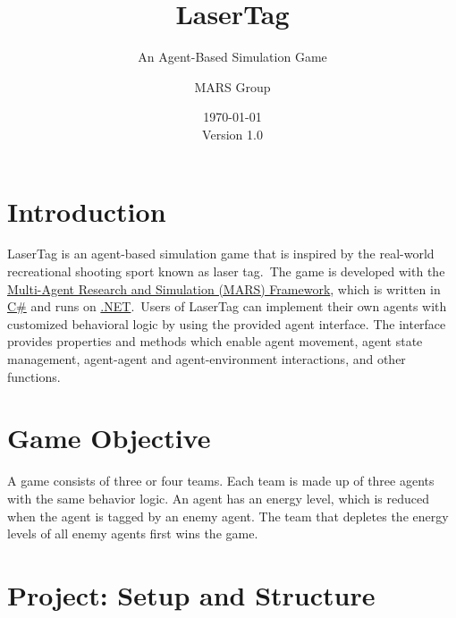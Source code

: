 \documentclass[
  a4paper,
  english,
  DIV=16,
  11pt,
  parskip=half,
  dvipsnames,
  listof=totoc,		     %
  index=totoc,		     %
  bibliography=totoc,	 %
]{scrartcl}
\title{LaserTag}
\subtitle{An Agent-Based Simulation Game}
\author{MARS Group}
\date{\today\\Version 1.0}
\begin{document}
\maketitle
%
%
\tableofcontents
%
%
\clearpage
%
\section{Introduction}
LaserTag is an agent-based simulation game that is inspired by the real-world recreational shooting sport known as laser tag.~The game is developed with the \href{https://mars-group-haw.github.io/index.html}{Multi-Agent Research and Simulation (MARS) Framework}, which is written in \href{https://learn.microsoft.com/en-us/dotnet/csharp/}{C\#} and runs on \href{https://dotnet.microsoft.com/en-us/download}{.NET}.~Users of LaserTag can implement their own agents with customized behavioral logic by using the provided agent interface. The interface provides properties and methods which enable agent movement, agent state management, agent-agent and agent-environment interactions, and other functions.
%
\section{Game Objective} \label{sec:objective}
%
A game consists of three or four teams. Each team is made up of three agents with the same behavior logic. An agent has an energy level, which is reduced when the agent is tagged by an enemy agent. The team that depletes the energy levels of all enemy agents first wins the game.
%
%
\section{Project: Setup and Structure} \label{sec:projsetupandstruc}
%
\end{document}
